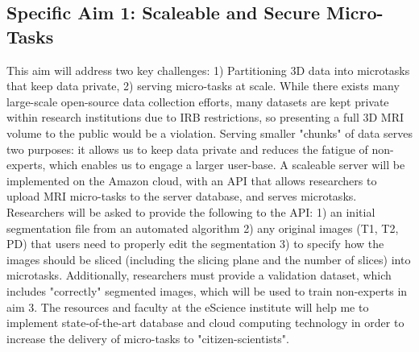 \subsection{Specific Aim 1: Scaleable and Secure Micro-Tasks}

This aim will address two key challenges: 1) Partitioning 3D data into microtasks that keep data private, 2) serving micro-tasks at scale. While there exists many large-scale open-source data collection efforts, many datasets are kept private within research institutions due to  IRB restrictions, so presenting a full 3D MRI volume to the public would be a violation. Serving smaller "chunks" of data serves two purposes: it allows us to keep data private and reduces the fatigue of non-experts, which enables us to engage a larger user-base. A scaleable server will be implemented on the Amazon cloud, with an API that allows researchers to upload MRI micro-tasks to the server database, and serves microtasks. Researchers will be asked to provide the following to the API: 1) an initial segmentation file from an automated algorithm 2) any original images (T1, T2, PD) that  users need to properly edit the segmentation 3) to specify how the images should be sliced (including the slicing plane and the number of slices) into microtasks. Additionally, researchers must provide a validation dataset, which includes "correctly" segmented images, which will be used to train non-experts in aim 3. The resources and faculty at the eScience institute will help me to implement state-of-the-art database and cloud computing technology in order to increase the delivery of micro-tasks to "citizen-scientists".